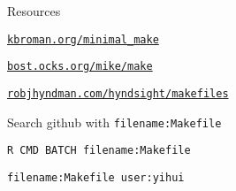 \documentclass[12pt,t]{beamer}
\begin{document}
\begin{frame}[fragile]{Resources}


  \bbi
  \item \href{https://kbroman.org/minimal_make}{\color{foreground} \tt kbroman.org/minimal\_make}
  \item \href{https://bost.ocks.org/mike/make/}{\color{foreground} \tt bost.ocks.org/mike/make}
  \item \href{https://robjhyndman.com/hyndsight/makefiles/}{\color{foreground} \tt robjhyndman.com/hyndsight/makefiles}
  \item Search github with {\tt filename:Makefile}

    \bi
    \item {\color{hilit} \verb|R CMD BATCH filename:Makefile|}

    \item {\color{hilit} \verb|filename:Makefile user:yihui|}
     \ei

  \ei


\end{frame}
\end{document}
